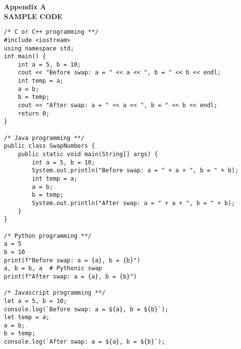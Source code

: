 \documentclass[12pt, english, onehalfspacing]{report}
\begin{document}
\newpage
\begin{center}
 {\Large \textbf{Appendix A}} \\\vspace*{0.5 cm}
 {\Large \textbf{SAMPLE CODE}}
 
\end{center}
\begin{lstlisting}
/* C or C++ programming **/
#include <iostream>
using namespace std;
int main() {
    int a = 5, b = 10;
    cout << "Before swap: a = " << a << ", b = " << b << endl;
    int temp = a;
    a = b;
    b = temp;
    cout << "After swap: a = " << a << ", b = " << b << endl;
    return 0;
}

/* Java programming **/
public class SwapNumbers {
    public static void main(String[] args) {
        int a = 5, b = 10;
        System.out.println("Before swap: a = " + a + ", b = " + b);
        int temp = a;
        a = b;
        b = temp;
        System.out.println("After swap: a = " + a + ", b = " + b);
    }
}

/* Python programming **/
a = 5
b = 10
print(f"Before swap: a = {a}, b = {b}")
a, b = b, a  # Pythonic swap
print(f"After swap: a = {a}, b = {b}")

/* Javascript programming **/
let a = 5, b = 10;
console.log(`Before swap: a = ${a}, b = ${b}`);
let temp = a;
a = b;
b = temp;
console.log(`After swap: a = ${a}, b = ${b}`);
\end{lstlisting}

\end{document}
